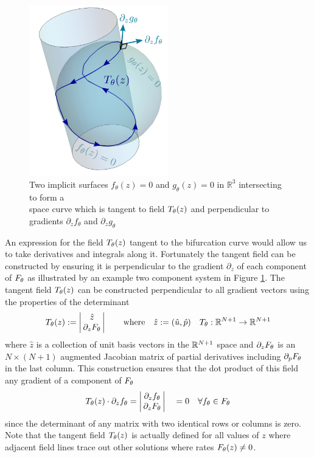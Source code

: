 \begin{figure}[H]
\centering{}
\captionsetup{justification=centering}
\includegraphics[width=6cm]{docs/figures/implicit-surfaces}
\caption{Two implicit surfaces $f_{\theta}(z)=0$ and $g_{\theta}(z)=0$ in $\mathbb{R}^3$ intersecting to form a\\ space curve which is tangent to field $T_{\theta}(z)$ and perpendicular to gradients $\partial_{z}f_{\theta}$ and $\partial_{z}g_{\theta}$}
\label{fig:implicit-surfaces}
\end{figure}

An expression for the field $T_{\theta}(z)$ tangent to the bifurcation curve would allow us to take derivatives and integrals along it. Fortunately the tangent field can be constructed by ensuring it is perpendicular to the gradient $\partial_z$ of each component of $F_{\theta}$ as illustrated by an example two component system in Figure \ref{fig:implicit-surfaces}. The tangent field $T_{\theta}(z)$ can be constructed perpendicular to all gradient vectors using the properties of the determinant \cite{Goldman2005CurvatureSurfaces}
\begin{align}
    T_{\theta}(z):=
    \left|\begin{matrix}
        \hat{z} \\
        \,\partial_{z}F_{\theta}\,
    \end{matrix}\right|
    \qquad\mathrm{where}\quad
    \hat{z}:=(\hat{u},\hat{p})\quad
	T_{\theta} : \mathbb{R}^{N+1}\rightarrow\mathbb{R}^{N+1}
	\label{eq:tangent-field}
\end{align}
where $\hat{z}$ is a collection of unit basis vectors in the $\mathbb{R}^{N+1}$ space and $\partial_{z}F_{\theta}$ is an $N\times(N+1)$ augmented Jacobian matrix of partial derivatives including $\partial_p F_{\theta}$ in the last column. This construction ensures that the dot product of this field any gradient of a component of $F_{\theta}$
\begin{align}
    T_{\theta}(z)\cdot\partial_z f_{\theta} =
    \left|\begin{matrix}
        \partial_z f_{\theta} \\
        \,\partial_{z}F_{\theta}\,
    \end{matrix}\right|
    \quad =0 \quad\forall f_{\theta}\in F_{\theta}
\end{align}
since the determinant of any matrix with two identical rows or columns is zero. Note that the tangent field $T_{\theta}(z)$ is actually defined for all values of $z$ where adjacent field lines trace out other solutions where rates $F_{\theta}(z)\neq0$.

